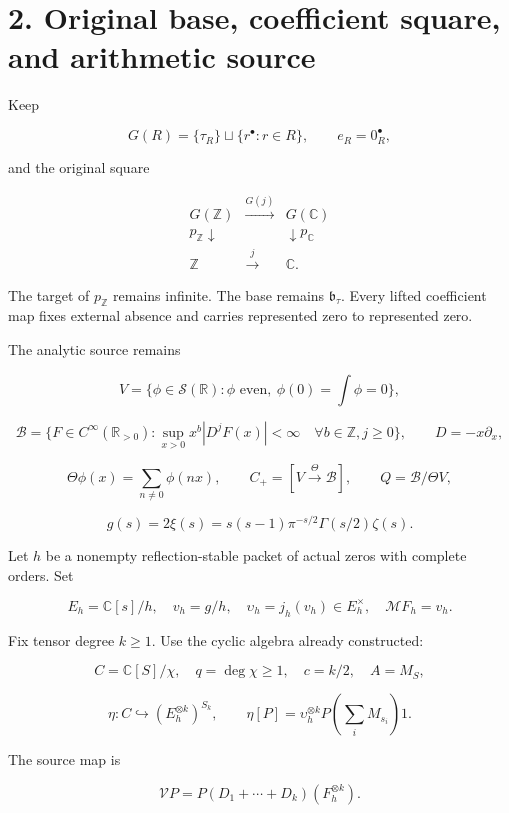\documentclass[
  11pt,
]{article}
\begin{document}
\section{2. Original base, coefficient square, and arithmetic
source}\label{original-base-coefficient-square-and-arithmetic-source}

Keep

\[
G(R)=\{\tau_R\}\sqcup\{r^\bullet:r\in R\},\qquad e_R=0_R^\bullet,
\]

and the original square

\[
\begin{array}{ccc}
G(\mathbb Z)&\xrightarrow{G(j)}&G(\mathbb C)\\
p_{\mathbb Z}\downarrow&&\downarrow p_{\mathbb C}\\
\mathbb Z&\xrightarrow{j}&\mathbb C.
\end{array}
\tag{4}
\]

The target of \(p_{\mathbb Z}\) remains infinite. The base remains
\(\mathfrak b_\tau\). Every lifted coefficient map fixes external
absence and carries represented zero to represented zero.

The analytic source remains

\[
V=\{\phi\in\mathcal S(\mathbb R):\phi\text{ even},\ \phi(0)=\int\phi=0\},
\]

\[
\mathscr B=\{F\in C^\infty(\mathbb R_{>0}):\sup_{x>0}x^b|D^jF(x)|<\infty\quad\forall b\in\mathbb Z,j\ge0\},
\qquad D=-x\partial_x,
\]

\[
\Theta\phi(x)=\sum_{n\ne0}\phi(nx),\qquad
C_+=[V\xrightarrow{\Theta}\mathscr B],\qquad Q=\mathscr B/\Theta V,
\]

\[
g(s)=2\xi(s)=s(s-1)\pi^{-s/2}\Gamma(s/2)\zeta(s).
\]

Let \(h\) be a nonempty reflection-stable packet of actual zeros with
complete orders. Set

\[
E_h=\mathbb C[s]/h,\quad v_h=g/h,\quad
\upsilon_h=j_h(v_h)\in E_h^\times,\quad \mathcal MF_h=v_h.
\]

Fix tensor degree \(k\ge1\). Use the cyclic algebra already constructed:

\[
C=\mathbb C[S]/\chi,\quad q=\deg\chi\ge1,\quad c=k/2,\quad A=M_S,
\]

\[
\eta:C\hookrightarrow(E_h^{\otimes k})^{S_k},\qquad
\eta[P]=\upsilon_h^{\otimes k}P\!\left(\sum_iM_{s_i}\right)1.
\]

The source map is

\[
\mathcal V P=P(D_1+\cdots+D_k)(F_h^{\otimes k}).
\]
\end{document}
